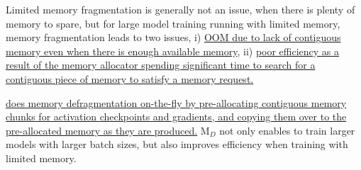 Limited memory fragmentation is generally not an issue, when there is plenty of memory to spare, but for large model training running with limited memory, memory fragmentation leads to two issues, i) \uline{OOM due to lack of contiguous memory even when there is enough available memory}, ii) \uline{poor efficiency as a result of the memory allocator spending significant time to search for a contiguous piece of memory to satisfy a memory request.}

\uline{\name does memory defragmentation on-the-fly by pre-allocating contiguous memory chunks for activation checkpoints and gradients, and copying them over to the pre-allocated memory as they are produced.} M$_D$ not only enables \name to train larger models with larger batch sizes, but also improves efficiency when training with limited memory.